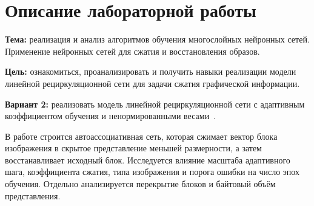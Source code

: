 \section{Описание лабораторной работы}
\label{sec:intro}

\textbf{Тема:} реализация и анализ алгоритмов обучения многослойных нейронных сетей. Применение нейронных сетей для сжатия и восстановления образов.

\textbf{Цель:} ознакомиться, проанализировать и получить навыки реализации модели линейной рециркуляционной сети для задачи сжатия графической информации.

\textbf{Вариант 2:} реализовать модель линейной рециркуляционной сети с адаптивным коэффициентом обучения и ненормированными весами~\cite{method}.

В работе строится автоассоциативная сеть, которая сжимает вектор блока изображения в скрытое представление меньшей размерности, а затем восстанавливает исходный блок. Исследуется влияние масштаба адаптивного шага, коэффициента сжатия, типа изображения и порога ошибки на число эпох обучения. Отдельно анализируется перекрытие блоков и байтовый объём представления.
